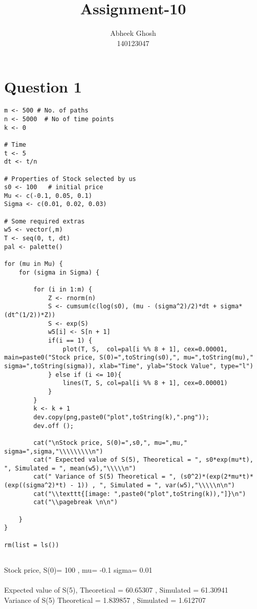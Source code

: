 \documentclass{article}
\begin{document}
	\title{\textbf{Assignment-10}}
	\author{Abheek Ghosh \\ 
		140123047 }
	
	\maketitle
	

\section{Question 1}


\begin{lstlisting}
m <- 500 # No. of paths
n <- 5000  # No of time points
k <- 0

# Time
t <- 5
dt <- t/n

# Properties of Stock selected by us
s0 <- 100   # initial price
Mu <- c(-0.1, 0.05, 0.1)
Sigma <- c(0.01, 0.02, 0.03)

# Some required extras
w5 <- vector(,m)
T <- seq(0, t, dt)
pal <- palette()

for (mu in Mu) {
    for (sigma in Sigma) {

        for (i in 1:m) {
            Z <- rnorm(n)
            S <- cumsum(c(log(s0), (mu - (sigma^2)/2)*dt + sigma*(dt^(1/2))*Z))
            S <- exp(S)
            w5[i] <- S[n + 1]
            if(i == 1) {
                plot(T, S,  col=pal[i %% 8 + 1], cex=0.00001, main=paste0("Stock price, S(0)=",toString(s0),", mu=",toString(mu)," sigma=",toString(sigma)), xlab="Time", ylab="Stock Value", type="l")
            } else if (i <= 10){
                lines(T, S, col=pal[i %% 8 + 1], cex=0.00001)
            }
        }
        k <- k + 1
        dev.copy(png,paste0("plot",toString(k),".png"));
        dev.off ();

        cat("\nStock price, S(0)=",s0,", mu=",mu," sigma=",sigma,"\\\\\\\\\n")
        cat(" Expected value of S(5), Theoretical = ", s0*exp(mu*t), ", Simulated = ", mean(w5),"\\\\\n")
        cat(" Variance of S(5) Theoretical = ", (s0^2)*(exp(2*mu*t)*(exp((sigma^2)*t) - 1)) , ", Simulated = ", var(w5),"\\\\\n\n")
        cat("\\texttt{[image: ",paste0("plot",toString(k)),"]}\n")
        cat("\\pagebreak \n\n")

    }
}

rm(list = ls())


\end{lstlisting}
Stock price, S(0)= 100 , mu= -0.1  sigma= 0.01 \\\\
 Expected value of S(5), Theoretical =  60.65307 , Simulated =  61.30941 \\
 Variance of S(5) Theoretical =  1.839857 , Simulated =  1.612707 \\
\end{document}
